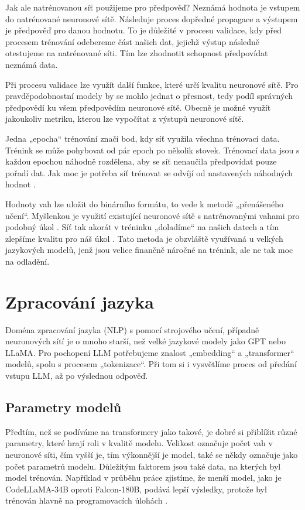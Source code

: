 \documentclass[FM,DP]{tulthesis}
\begin{document}
		Jak ale natrénovanou síť použijeme pro předpověď? Neznámá hodnota je vstupem do natrénované neuronové sítě. Následuje proces dopředné propagace a výstupem je předpověď pro danou hodnotu. To je důležité v procesu validace, kdy před procesem trénování odebereme část našich dat, jejichž výstup následně otestujeme na natrénované síti. Tím lze zhodnotit schopnost předpovídat neznámá data.
		
		Při procesu validace lze využít další funkce, které určí kvalitu neuronové sítě. Pro pravděpodobnostní modely by se mohlo jednat o přesnost, tedy podíl správných předpovědí ku všem předpovědím neuronové sítě. Obecně je možné využít jakoukoliv metriku, kterou lze vypočítat z výstupů neuronové sítě.
		
		Jedna „epocha“ trénování značí bod, kdy síť využila všechna trénovací data. Trénink se může pohybovat od pár epoch po několik stovek. Trénovací data jsou s každou epochou náhodně rozdělena, aby se síť nenaučila předpovídat pouze pořadí dat. Jak moc je potřeba síť trénovat se odvíjí od nastavených náhodných hodnot \cite{tds_train}. 
		
		Hodnoty vah lze uložit do binárního formátu, to vede k metodě „přenášeného učení“. Myšlenkou je využití existující neuronové sítě s natrénovanými vahami pro podobný úkol \cite{wiki:transfer}. Síť tak akorát v tréninku „doladíme“ na našich datech a tím zlepšíme kvalitu pro náš úkol \cite{hgf:finetune}. Tato metoda je obzvláště využívaná u velkých jazykových modelů, jenž jsou velice finančně náročné na trénink, ale ne tak moc na odladění.
		
		\chapter{Zpracování jazyka}
		Doména zpracování jazyka (NLP) s pomocí strojového učení, případně neuronových sítí je o mnoho starší, než velké jazykové modely jako GPT nebo LLaMA. Pro pochopení LLM potřebujeme znalost „embedding“ a „transformer“ modelů, spolu s procesem „tokenizace“. Při tom si i vysvětlíme proces od předání vstupu LLM, až po výslednou odpověď.
		
		\section{Parametry modelů}
		Předtím, než se podíváme na transformery jako takové, je dobré si přiblížit různé parametry, které hrají roli v kvalitě modelu. Velikost označuje počet vah v neuronové síti, čím vyšší je, tím výkonnější je model, také se někdy označuje jako počet parametrů modelu. Důležitým faktorem jsou také data, na kterých byl model trénován. Například v průběhu práce zjistíme, že menší model, jako je CodeLLaMA-34B oproti Falcon-180B, podává lepší výsledky, protože byl trénován hlavně na programovacích úlohách \cite{llm_parameters} \cite{embeddings}.
		
\end{document}
